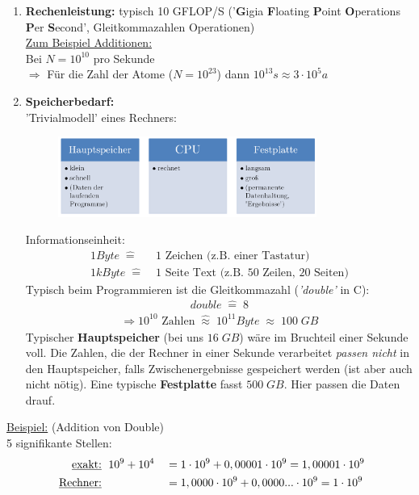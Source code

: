\documentclass[12pt]{article}
\begin{document}
\begin{enumerate}
\item \textbf{Rechenleistung:} 
typisch 10 GFLOP/S ('\textbf{G}igia \textbf{F}loating \textbf{P}oint \textbf{O}perations \textbf{P}er \textbf{S}econd', Gleitkommazahlen Operationen) \\
\underline{Zum Beispiel Additionen:} \\
Bei $N=10^{10} $ pro Sekunde \\
$\Rightarrow$  Für die Zahl der Atome  ($N = 10^{23}$) dann $10^{13} s \approx 3 \cdot 10^5 a$

\item \textbf{Speicherbedarf:} \\
'Trivialmodell' eines Rechners: 

\begin{figure}[ht]
	\centering
  \includegraphics[width=0.8\textwidth]{Null_Rechner.png}
	\label{Null_DrittesStandbein}
\end{figure}
Informationseinheit: 
\begin{align*}
 1 Byte \;   \widehat{=} & \; 1 \mbox{ Zeichen (z.B. einer Tastatur)} \\
 1 kByte \; \widehat{=} & \;  1 \mbox{ Seite Text (z.B. 50 Zeilen, 20 Seiten}) 
\end{align*}
Typisch beim Programmieren ist die Gleitkommazahl (\textit{'double'} in C):
\begin{align*}
double \; \widehat{=} \; 8
\end{align*}
\begin{align*}
\Rightarrow 10^{10} \mbox{ Zahlen} \; \widehat{ \approx } \; 10^{11} Byte \; \approx \; 100 \; GB
\end{align*}
Typischer \textbf{Hauptspeicher} (bei uns $16 \; GB$) wäre im Bruchteil einer Sekunde voll. Die Zahlen, die der Rechner in einer Sekunde verarbeitet \textit{passen nicht} in den Hauptspeicher, falls Zwischenergebnisse gespeichert werden (ist aber auch nicht nötig). Eine typische \textbf{Festplatte} fasst $500 \; GB$. Hier passen die Daten drauf. 
\end{enumerate}

\underline{Beispiel:} (Addition von Double) \\
5 signifikante Stellen:
\begin{align*}
\mbox{ \underline{exakt:} } & \; 10^9 + 10^4 && = 1 \cdot 10^9 + 0,00001 \cdot 10^9 = 1,00001 \cdot 10^9 \\
\mbox{ \underline{Rechner:} }&  &&= 1,0000 \cdot 10^9 + 0,0000... \cdot 10^9 = 1 \cdot 10^9
\end{align*}
\end{document}
